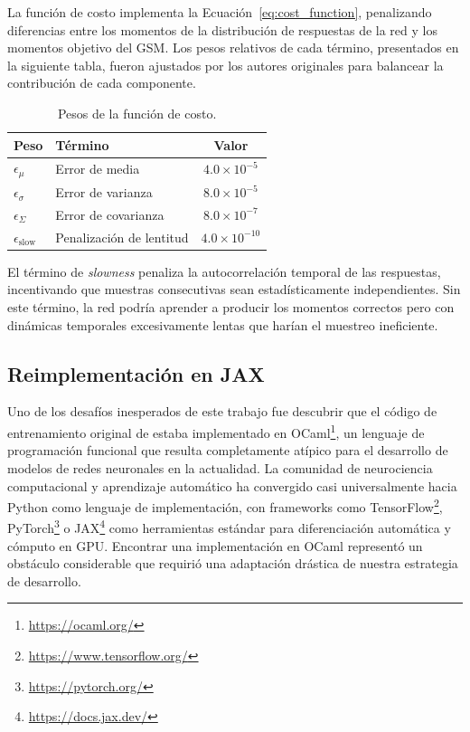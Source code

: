 La función de costo implementa la Ecuación~\ref{eq:cost_function}, penalizando diferencias entre los momentos de la distribución de respuestas de la red y los momentos objetivo del \acrshort{GSM}. Los pesos relativos de cada término, presentados en la siguiente tabla, fueron ajustados por los autores originales para balancear la contribución de cada componente.

\begin{table}[H]
\centering
\caption{Pesos de la función de costo.}
\label{tab:cost_weights}
\begin{tabular}{llc}
\toprule
\textbf{Peso} & \textbf{Término} & \textbf{Valor} \\
\midrule
$\epsilon_\mu$ & Error de media & $4.0 \times 10^{-5}$ \\
$\epsilon_\sigma$ & Error de varianza & $8.0 \times 10^{-5}$ \\
$\epsilon_\Sigma$ & Error de covarianza & $8.0 \times 10^{-7}$ \\
$\epsilon_{\text{slow}}$ & Penalización de lentitud & $4.0 \times 10^{-10}$ \\
\bottomrule
\end{tabular}
\end{table}

El término de \textit{slowness} penaliza la autocorrelación temporal de las respuestas, incentivando que muestras consecutivas sean estadísticamente independientes. Sin este término, la red podría aprender a producir los momentos correctos pero con dinámicas temporales excesivamente lentas que harían el muestreo ineficiente.

\subsection{Reimplementación en JAX}
\label{subsec:impl_jax}

Uno de los desafíos inesperados de este trabajo fue descubrir que el código de entrenamiento original de \citet{echeveste2020cortical} estaba implementado en OCaml\footnote{\url{https://ocaml.org/}}, un lenguaje de programación funcional que resulta completamente atípico para el desarrollo de modelos de redes neuronales en la actualidad. La comunidad de neurociencia computacional y aprendizaje automático ha convergido casi universalmente hacia Python como lenguaje de implementación, con frameworks como TensorFlow\footnote{\url{https://www.tensorflow.org/}}, PyTorch\footnote{\url{https://pytorch.org/}} o JAX\footnote{\url{https://docs.jax.dev/}} como herramientas estándar para diferenciación automática y cómputo en \acrshort{GPU}. Encontrar una implementación en OCaml representó un obstáculo considerable que requirió una adaptación drástica de nuestra estrategia de desarrollo.

